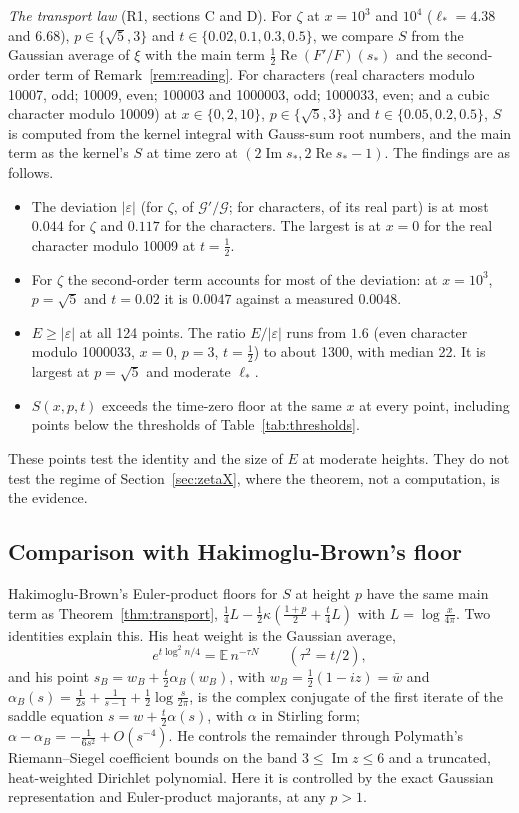 \documentclass[11pt]{article}
\theoremstyle{definition}
\theoremstyle{remark}
\newcommand{\E}{\mathbb E}
\newcommand{\cG}{\mathcal G}
\newcommand{\re}{\operatorname{Re}}
\newcommand{\im}{\operatorname{Im}}
\numberwithin{equation}{section}
\begin{document}
\emph{The transport law} (R1, sections C and D). For $\zeta$ at $x=10^3$
and $10^4$ ($\ell_*=4.38$ and $6.68$), $p\in\{\sqrt5,3\}$ and
$t\in\{0.02,0.1,0.3,0.5\}$, we compare $S$ from the Gaussian average of
$\xi$ with the main term $\frac12\re(F'/F)(s_*)$ and the second-order term
of Remark~\ref{rem:reading}. For characters (real characters modulo 10007,
odd; 10009, even; 100003 and 1000003, odd; 1000033, even; and a cubic
character modulo 10009) at $x\in\{0,2,10\}$, $p\in\{\sqrt5,3\}$ and
$t\in\{0.05,0.2,0.5\}$, $S$ is computed from the kernel integral with
Gauss-sum root numbers, and the main term as the kernel's $S$ at time zero
at $(2\im s_*,2\re s_*-1)$. The findings are as follows.
\begin{itemize}
\item The deviation $\lvert\varepsilon\rvert$ (for $\zeta$, of
$\cG'/\cG$; for characters, of its real part) is at most $0.044$ for
$\zeta$ and $0.117$ for the characters. The largest is at $x=0$ for the
real character modulo 10009 at $t=\frac12$.
\item For $\zeta$ the second-order term accounts for most of the
deviation: at $x=10^3$, $p=\sqrt5$ and $t=0.02$ it is $0.0047$ against a
measured $0.0048$.
\item $E\ge\lvert\varepsilon\rvert$ at all 124 points. The ratio
$E/\lvert\varepsilon\rvert$ runs from $1.6$ (even character modulo
1000033, $x=0$, $p=3$, $t=\frac12$) to about 1300, with median 22. It is
largest at $p=\sqrt5$ and moderate $\ell_*$.
\item $S(x,p,t)$ exceeds the time-zero floor at the same $x$ at every
point, including points below the thresholds of
Table~\ref{tab:thresholds}.
\end{itemize}
These points test the identity and the size of $E$ at moderate heights.
They do not test the regime of Section~\ref{sec:zetaX}, where the theorem,
not a computation, is the evidence.

\subsection{Comparison with Hakimoglu-Brown's floor}\label{sec:compare}

Hakimoglu-Brown's Euler-product floors for $S$ at height $p$
\cite[Propositions~8 and~11]{hb} have the same main term as
Theorem~\ref{thm:transport},
$\frac14L-\frac12\kappa(\frac{1+p}2+\frac t4L)$ with $L=\log\frac x{4\pi}$.
Two identities explain this. His heat weight is the Gaussian average,
\[
e^{t\log^2n/4}=\E\,n^{-\tau N}\qquad(\tau^2=t/2),
\]
and his point $s_B=w_B+\frac t2\alpha_B(w_B)$, with $w_B=\frac12(1-iz)=\bar w$
and $\alpha_B(s)=\frac1{2s}+\frac1{s-1}+\frac12\log\frac s{2\pi}$, is the
complex conjugate of the first iterate of the saddle equation
$s=w+\frac t2\alpha(s)$, with $\alpha$ in Stirling form;
$\alpha-\alpha_B=-\frac1{6s^2}+O(s^{-4})$. He controls the remainder
through Polymath's Riemann--Siegel coefficient bounds
\cite[Propositions~6.1--6.2]{polymath} on the band $3\le\im z\le6$ and a
truncated, heat-weighted Dirichlet polynomial. Here it is controlled by
the exact Gaussian representation and Euler-product majorants, at any
$p>1$.
\end{document}
